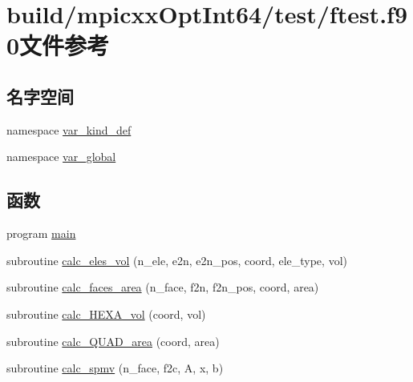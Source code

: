 \hypertarget{build_2mpicxxOptInt64_2test_2ftest_8f90}{
\section{build/mpicxxOptInt64/test/ftest.f90文件参考}
\label{build_2mpicxxOptInt64_2test_2ftest_8f90}
}
\subsection*{名字空间}
\begin{DoxyCompactItemize}
\item 
namespace \hyperlink{namespacevar__kind__def}{var\_\-kind\_\-def}
\item 
namespace \hyperlink{namespacevar__global}{var\_\-global}
\end{DoxyCompactItemize}
\subsection*{函数}
\begin{DoxyCompactItemize}
\item 
program \hyperlink{build_2mpicxxOptInt64_2test_2ftest_8f90_a8ec2266d83cd6c0b762cbcbc92c0af3d}{main}
\item 
subroutine \hyperlink{build_2mpicxxOptInt64_2test_2ftest_8f90_ab0feb0b96896d0783a452ceb0884de54}{calc\_\-eles\_\-vol} (n\_\-ele, e2n, e2n\_\-pos, coord, ele\_\-type, vol)
\item 
subroutine \hyperlink{build_2mpicxxOptInt64_2test_2ftest_8f90_a65b36ff25ffa106dab5c6b52332982e1}{calc\_\-faces\_\-area} (n\_\-face, f2n, f2n\_\-pos, coord, area)
\item 
subroutine \hyperlink{build_2mpicxxOptInt64_2test_2ftest_8f90_aedcabc3101935ffa79dac989cdf8cf09}{calc\_\-HEXA\_\-vol} (coord, vol)
\item 
subroutine \hyperlink{build_2mpicxxOptInt64_2test_2ftest_8f90_a638fb93022b93255d8000bacff09a674}{calc\_\-QUAD\_\-area} (coord, area)
\item 
subroutine \hyperlink{build_2mpicxxOptInt64_2test_2ftest_8f90_a5595358e7ada913cd10a206235165422}{calc\_\-spmv} (n\_\-face, f2c, A, x, b)
\end{DoxyCompactItemize}
